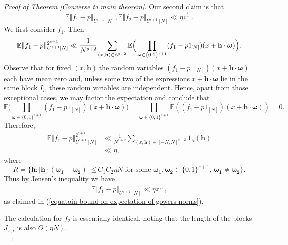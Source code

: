 \documentclass[12pt,a4paper,twoside,reqno]{amsart}
\numberwithin{equation}{section}
\begin{document}
\begin{proof}[Proof of Theorem \ref{Converse to main theorem}]
Our second claim is that 
\begin{equation}
\label{equatoin bound on expectation of gowers norms}
\mathbb{E}\Vert f_1 - p\Vert_{U^{s+1}[N]},\mathbb{E}\Vert f_2 - p\Vert_{U^{s+1}[N]} \ll \eta^{\frac{1}{2^{s+1}}}.
\end{equation} We first consider $f_1$. Then $$\mathbb{E}\Vert f_1 - p\Vert_{U^{s+1}[N]}^{2^{s+1}} \ll \frac{1}{N^{s+2}}\sum\limits_{\substack(x,\mathbf{h})\in \mathbb{Z}^{s+2}}\\ \mathbb{E}\Big(\prod\limits_{\boldsymbol{\omega} \in \{0,1\}^{s+1}} (f_1 - p1_{[N]})(x+\mathbf{h}\cdot\boldsymbol{\omega})\Big).$$ Observe that for fixed $(x,\mathbf{h})$ the random variables $(f_1 - p1_{[N]})(x+\mathbf{h}\cdot\boldsymbol{\omega})$ each have mean zero and, unless some two of the expressions $x+\mathbf{h}\cdot\boldsymbol{\omega}$ lie in the same block $I_i$, these random variables are independent. Hence, apart from those exceptional cases, we may factor the expectation and conclude that $$\mathbb{E}\Big(\prod\limits_{\boldsymbol{\omega} \in \{0,1\}^{s+1}} (f_1 - p1_{[N]})(x+\mathbf{h}\cdot\boldsymbol{\omega})\Big) = \prod\limits_{\boldsymbol{\omega} \in \{0,1\}^{s+1}} \mathbb{E}((f_1 - p1_{[N]})(x+\mathbf{h}\cdot\boldsymbol{\omega})) = 0.$$ Therefore,
\begin{align*}
\mathbb{E}\Vert f_1 - p\Vert_{U^{s+1}[N]}^{2^{s+1}}&\ll\frac{1}{N^{s+2}} \sum\limits_{(x,\mathbf{h})\in [-N,N]^{s+2}} 1_R(\mathbf{h})\\
&\ll \eta,
\end{align*}
\noindent where \[R = \{\mathbf{h}:\vert\mathbf{h}\cdot(\boldsymbol{\omega_1} - \boldsymbol{\omega_2})\vert \leqslant C_1C_2\eta N \text{ for some }\boldsymbol{\omega_1},\boldsymbol{\omega_2}\in \{0,1\}^{s+1},\, \boldsymbol{\omega_1}\neq\boldsymbol{\omega_2}\}.\]
\noindent Thus by Jensen's inequality we have 
\begin{equation}
\mathbb{E}\Vert f_1 - p\Vert_{U^{s+1}[N]} \ll \eta^{\frac{1}{2^{s+1}}},
\end{equation}
\noindent as claimed in (\ref{equatoin bound on expectation of gowers norms}).

The calculation for $f_2$ is essentially identical, noting that the length of the blocks $J_{x,i}$ is also $O(\eta N)$. \\


\end{proof}
\end{document}
